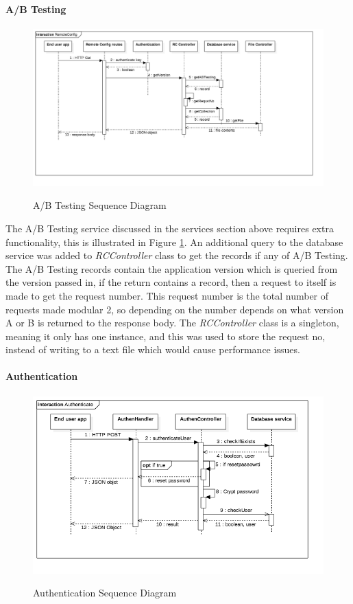 \paragraph{A/B Testing}

\begin{figure}[!h]
    \caption{A/B Testing Sequence Diagram}
    \centering
    \includegraphics[width=150mm]{images/sequence/ABTesting}
    \label{fig:ab-seq}
\end{figure} 

The A/B Testing service discussed in the services section above requires extra functionality, this is illustrated in Figure  \ref{fig:ab-seq}. An additional query to the database service was added to \textit{RCController} class to get the records if any of A/B Testing. The A/B Testing records contain the application version which is queried from the version passed in, if the return contains a record, then a request to itself is made to get the request number. This request number is the total number of requests made modular 2, so depending on the number depends on what version A or B is returned to the response body. The \textit{RCController} class is a singleton, meaning it only has one instance, and this was used to store the request no, instead of writing to a text file which would cause performance issues.

\paragraph{Authentication}

\begin{figure}[!h]
    \caption{Authentication Sequence Diagram}
    \centering
    \includegraphics[width=150mm]{images/sequence/Authenticate}
    \label{fig:authenticate-seq}
\end{figure}

